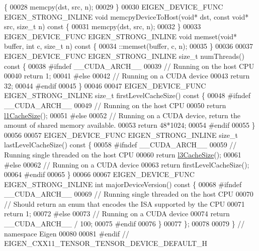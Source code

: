 \begin{DoxyCode}
{       }\{
00028     memcpy(dst, src, n);
00029   \}
00030   EIGEN\_DEVICE\_FUNC EIGEN\_STRONG\_INLINE \textcolor{keywordtype}{void} memcpyDeviceToHost(\textcolor{keywordtype}{void}* dst, \textcolor{keyword}{const} \textcolor{keywordtype}{void}* src, \textcolor{keywordtype}{size\_t} n)\textcolor{keyword}{ const
       }\{
00031     memcpy(dst, src, n);
00032   \}
00033   EIGEN\_DEVICE\_FUNC EIGEN\_STRONG\_INLINE \textcolor{keywordtype}{void} memset(\textcolor{keywordtype}{void}* buffer, \textcolor{keywordtype}{int} c, \textcolor{keywordtype}{size\_t} n)\textcolor{keyword}{ const }\{
00034     ::memset(buffer, c, n);
00035   \}
00036 
00037   EIGEN\_DEVICE\_FUNC EIGEN\_STRONG\_INLINE \textcolor{keywordtype}{size\_t} numThreads()\textcolor{keyword}{ const }\{
00038 \textcolor{preprocessor}{#ifndef \_\_CUDA\_ARCH\_\_}
00039     \textcolor{comment}{// Running on the host CPU}
00040     \textcolor{keywordflow}{return} 1;
00041 \textcolor{preprocessor}{#else}
00042     \textcolor{comment}{// Running on a CUDA device}
00043     \textcolor{keywordflow}{return} 32;
00044 \textcolor{preprocessor}{#endif}
00045   \}
00046 
00047   EIGEN\_DEVICE\_FUNC EIGEN\_STRONG\_INLINE \textcolor{keywordtype}{size\_t} firstLevelCacheSize()\textcolor{keyword}{ const }\{
00048 \textcolor{preprocessor}{#ifndef \_\_CUDA\_ARCH\_\_}
00049     \textcolor{comment}{// Running on the host CPU}
00050     \textcolor{keywordflow}{return} \hyperlink{namespace_eigen_a2669f89ff38296a38e6d973552eb4e33}{l1CacheSize}();
00051 \textcolor{preprocessor}{#else}
00052     \textcolor{comment}{// Running on a CUDA device, return the amount of shared memory available.}
00053     \textcolor{keywordflow}{return} 48*1024;
00054 \textcolor{preprocessor}{#endif}
00055   \}
00056 
00057   EIGEN\_DEVICE\_FUNC EIGEN\_STRONG\_INLINE \textcolor{keywordtype}{size\_t} lastLevelCacheSize()\textcolor{keyword}{ const }\{
00058 \textcolor{preprocessor}{#ifndef \_\_CUDA\_ARCH\_\_}
00059     \textcolor{comment}{// Running single threaded on the host CPU}
00060     \textcolor{keywordflow}{return} \hyperlink{namespace_eigen_ae2efa4852ea90c2d47b7dcec5b40ba2b}{l3CacheSize}();
00061 \textcolor{preprocessor}{#else}
00062     \textcolor{comment}{// Running on a CUDA device}
00063     \textcolor{keywordflow}{return} firstLevelCacheSize();
00064 \textcolor{preprocessor}{#endif}
00065   \}
00066 
00067   EIGEN\_DEVICE\_FUNC EIGEN\_STRONG\_INLINE \textcolor{keywordtype}{int} majorDeviceVersion()\textcolor{keyword}{ const }\{
00068 \textcolor{preprocessor}{#ifndef \_\_CUDA\_ARCH\_\_}
00069     \textcolor{comment}{// Running single threaded on the host CPU}
00070     \textcolor{comment}{// Should return an enum that encodes the ISA supported by the CPU}
00071     \textcolor{keywordflow}{return} 1;
00072 \textcolor{preprocessor}{#else}
00073     \textcolor{comment}{// Running on a CUDA device}
00074     \textcolor{keywordflow}{return} \_\_CUDA\_ARCH\_\_ / 100;
00075 \textcolor{preprocessor}{#endif}
00076   \}
00077 \};
00078 
00079 \}  \textcolor{comment}{// namespace Eigen}
00080 
00081 \textcolor{preprocessor}{#endif // EIGEN\_CXX11\_TENSOR\_TENSOR\_DEVICE\_DEFAULT\_H}
\end{DoxyCode}
